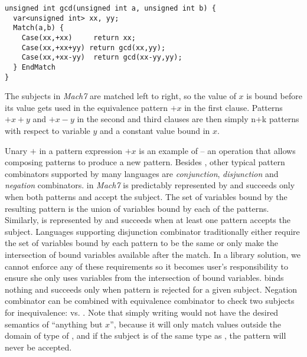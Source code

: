 \begin{lstlisting}[keepspaces,columns=flexible]
unsigned int gcd(unsigned int a, unsigned int b) {
  var<unsigned int> xx, yy;
  Match(a,b) {
    Case(xx,+xx)     return xx;
    Case(xx,+xx+yy) return gcd(xx,yy);
    Case(xx,+xx-yy)  return gcd(xx-yy,yy);
  } EndMatch
}
\end{lstlisting}

\noindent
The subjects in \emph{Mach7} are matched left to right, so the value of $x$ is 
bound before its value gets used in the equivalence pattern $+x$ in the first 
clause. Patterns $+x+y$ and $+x-y$ in the second and third clauses are then 
simply n+k patterns with respect to variable $y$ and a constant value bound in 
$x$. %

Unary $+$ in a pattern expression $+x$ is an example of  
-- an operation that allows composing patterns to produce a new pattern. 
Besides , other typical pattern combinators 
supported by many languages are \emph{conjunction}, \emph{disjunction} and 
\emph{negation} combinators.  in \emph{Mach7} is 
predictably represented by  and succeeds only when both patterns 
 and  accept the subject. The set of variables bound by the 
resulting pattern is the union of variables bound by each of the patterns. 
Similarly,  is represented by  and 
succeeds when at least one pattern accepts the subject. Languages supporting 
disjunction combinator traditionally either require the set of variables bound 
by each pattern to be the same or only make the intersection of bound variables 
available after the match. In a library solution, we cannot enforce any of these 
requirements so it becomes user's responsibility to ensure she only uses 
variables from the intersection of bound variables.  
 binds nothing and succeeds only when pattern  is rejected for 
a given subject. Negation combinator can be combined with equivalence combinator 
to check two subjects for inequivalence:  vs. . Note that 
simply writing  would not have the desired semantics of ``anything but 
$x$'', because it will only match values outside the domain of type of 
, and if the subject is of the same type as , the pattern 
 will never be accepted.

